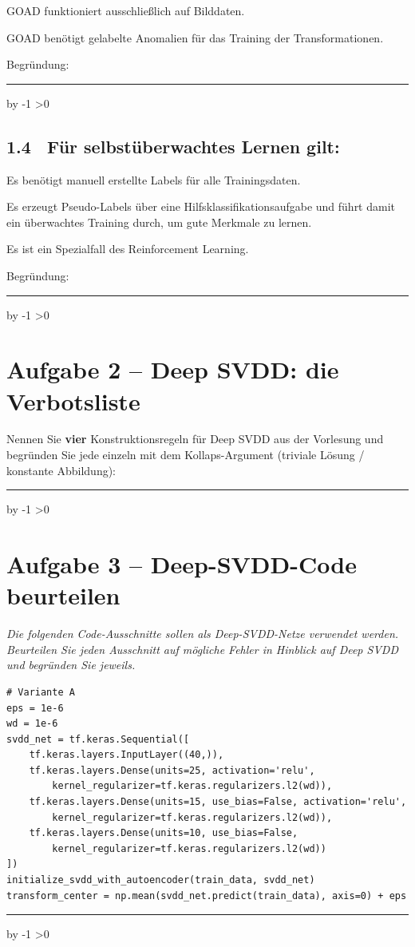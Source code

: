 \documentclass[10pt,a4paper]{article}
\newcommand{\mcbox}{\raisebox{-1pt}{\fbox{\rule{0pt}{7pt}\rule{7pt}{0pt}}}\hspace{6pt}}
\newcommand{\antwortlinien}[1]{%
  \par\vspace{2pt}%
  \newcount\zeilen \zeilen=#1
  \loop
    \noindent\rule{\linewidth}{0.4pt}\par\vspace{11pt}%
    \advance\zeilen by -1
  \ifnum\zeilen>0 \repeat
}
\begin{document}
\mcbox GOAD funktioniert ausschließlich auf Bilddaten.

\mcbox GOAD benötigt gelabelte Anomalien für das Training der Transformationen.

Begründung:
\antwortlinien{2}

\subsection*{1.4 \ Für selbstüberwachtes Lernen gilt:}
\mcbox Es benötigt manuell erstellte Labels für alle Trainingsdaten.

\mcbox Es erzeugt Pseudo-Labels über eine Hilfsklassifikationsaufgabe und führt damit
ein überwachtes Training durch, um gute Merkmale zu lernen.

\mcbox Es ist ein Spezialfall des Reinforcement Learning.

Begründung:
\antwortlinien{2}

\section*{Aufgabe 2 -- Deep SVDD: die Verbotsliste}

Nennen Sie \textbf{vier} Konstruktionsregeln für Deep SVDD aus der Vorlesung und begründen
Sie jede einzeln mit dem Kollaps-Argument (triviale Lösung / konstante Abbildung):

\antwortlinien{8}

\section*{Aufgabe 3 -- Deep-SVDD-Code beurteilen}

\emph{Die folgenden Code-Ausschnitte sollen als Deep-SVDD-Netze verwendet werden.
Beurteilen Sie jeden Ausschnitt auf mögliche Fehler in Hinblick auf Deep SVDD und
begründen Sie jeweils.}

\Needspace*{8cm}
\begin{lstlisting}
# Variante A
eps = 1e-6
wd = 1e-6
svdd_net = tf.keras.Sequential([
    tf.keras.layers.InputLayer((40,)),
    tf.keras.layers.Dense(units=25, activation='relu',
        kernel_regularizer=tf.keras.regularizers.l2(wd)),
    tf.keras.layers.Dense(units=15, use_bias=False, activation='relu',
        kernel_regularizer=tf.keras.regularizers.l2(wd)),
    tf.keras.layers.Dense(units=10, use_bias=False,
        kernel_regularizer=tf.keras.regularizers.l2(wd))
])
initialize_svdd_with_autoencoder(train_data, svdd_net)
transform_center = np.mean(svdd_net.predict(train_data), axis=0) + eps
\end{lstlisting}
\antwortlinien{3}
\end{document}
